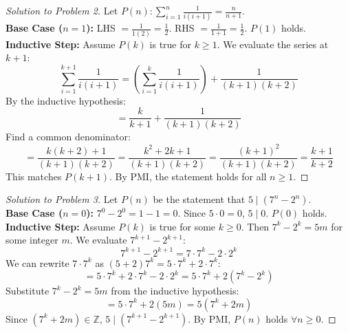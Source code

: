 \documentclass{article}
\begin{document}
\begin{proof}[Solution to Problem 2]
Let $P(n): \sum_{i=1}^n \frac{1}{i(i+1)} = \frac{n}{n+1}$. \\
\textbf{Base Case ($n=1$):} LHS $= \frac{1}{1(2)} = \frac{1}{2}$. RHS $= \frac{1}{1+1} = \frac{1}{2}$. $P(1)$ holds. \\
\textbf{Inductive Step:} Assume $P(k)$ is true for $k \ge 1$. We evaluate the series at $k+1$:
\[ \sum_{i=1}^{k+1} \frac{1}{i(i+1)} = \left( \sum_{i=1}^k \frac{1}{i(i+1)} \right) + \frac{1}{(k+1)(k+2)} \]
By the inductive hypothesis:
\[ = \frac{k}{k+1} + \frac{1}{(k+1)(k+2)} \]
Find a common denominator:
\[ = \frac{k(k+2) + 1}{(k+1)(k+2)} = \frac{k^2 + 2k + 1}{(k+1)(k+2)} = \frac{(k+1)^2}{(k+1)(k+2)} = \frac{k+1}{k+2} \]
This matches $P(k+1)$. By PMI, the statement holds for all $n \ge 1$.
\end{proof}

\begin{proof}[Solution to Problem 3]
Let $P(n)$ be the statement that $5 \mid (7^n - 2^n)$. \\
\textbf{Base Case ($n=0$):} $7^0 - 2^0 = 1 - 1 = 0$. Since $5 \cdot 0 = 0$, $5 \mid 0$. $P(0)$ holds. \\
\textbf{Inductive Step:} Assume $P(k)$ is true for some $k \ge 0$. Then $7^k - 2^k = 5m$ for some integer $m$. We evaluate $7^{k+1} - 2^{k+1}$:
\[ 7^{k+1} - 2^{k+1} = 7 \cdot 7^k - 2 \cdot 2^k \]
We can rewrite $7 \cdot 7^k$ as $(5 + 2)7^k = 5 \cdot 7^k + 2 \cdot 7^k$:
\[ = 5 \cdot 7^k + 2 \cdot 7^k - 2 \cdot 2^k = 5 \cdot 7^k + 2(7^k - 2^k) \]
Substitute $7^k - 2^k = 5m$ from the inductive hypothesis:
\[ = 5 \cdot 7^k + 2(5m) = 5(7^k + 2m) \]
Since $(7^k + 2m) \in \mathbb{Z}$, $5 \mid (7^{k+1} - 2^{k+1})$. By PMI, $P(n)$ holds $\forall n \ge 0$.
\end{proof}
\end{document}
